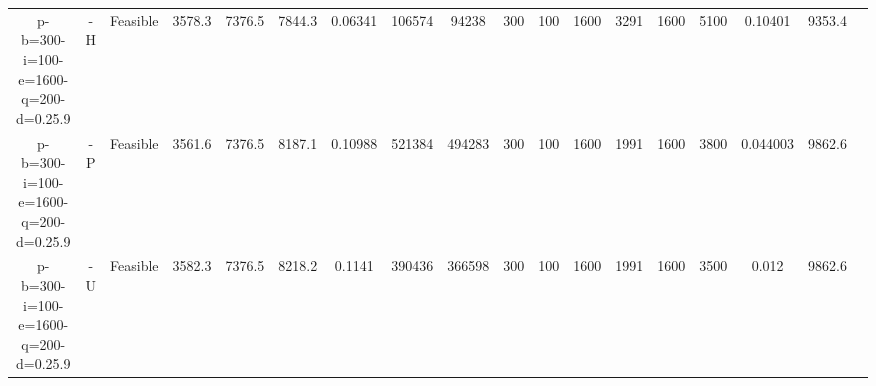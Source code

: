 \documentclass[landscape, a4paper]{article}
\begin{document}
\begin{center}
\begin{tabular}{@{}cccccccccccccccccc@{}}
p-b=300-i=100-e=1600-q=200-d=0.25.9 & -H & Feasible & 3578.3 & 7376.5 & 7844.3 & 0.06341 & 106574 & 94238 & 300 & 100 & 1600 & 3291 & 1600 & 5100 & 0.10401 & 9353.4 & \\
p-b=300-i=100-e=1600-q=200-d=0.25.9 & -P & Feasible & 3561.6 & 7376.5 & 8187.1 & 0.10988 & 521384 & 494283 & 300 & 100 & 1600 & 1991 & 1600 & 3800 & 0.044003 & 9862.6 & \\
p-b=300-i=100-e=1600-q=200-d=0.25.9 & -U & Feasible & 3582.3 & 7376.5 & 8218.2 & 0.1141 & 390436 & 366598 & 300 & 100 & 1600 & 1991 & 1600 & 3500 & 0.012 & 9862.6 & \\
\end{tabular}
\end{center}
\end{document}
